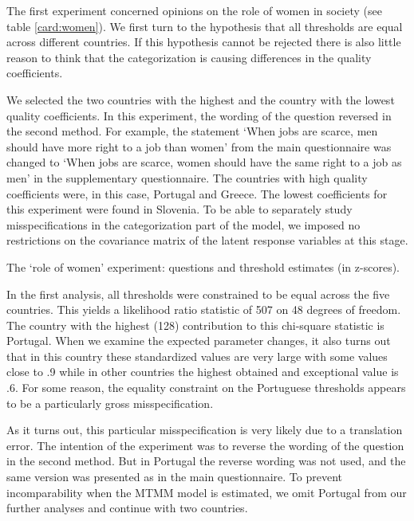 \documentclass[a4paper,12pt]{article}
\begin{document}
The first experiment concerned opinions on the role of women in society (see table \ref{card:women}). We first turn to the hypothesis that all thresholds are equal across different countries. If this hypothesis cannot be rejected  there is also little reason to think that the categorization is causing differences in the quality coefficients. 

We selected the two countries with the highest and the country with the lowest quality coefficients. In this experiment, the wording of the question reversed in the second method. For example, the statement `When jobs are scarce, men should have more right to a job than women' from the main questionnaire was changed to `When jobs are scarce, women should have the same right to a job as men' in the supplementary questionnaire. The countries with high quality coefficients were, in this case, Portugal and Greece. The lowest coefficients for this experiment were found in Slovenia. To be able to separately study misspecifications in the categorization part of the model, we imposed no restrictions on the covariance matrix of the latent response variables at this stage. 

\begin{table}[bht]\caption{\label{card:women}The `role of women' experiment: questions and threshold estimates (in z-scores).}\fbox{\begin{minipage}{\textwidth}\begin{small}
	
\end{small}\end{minipage}}\end{table}

In the first analysis, all thresholds were constrained to be equal across the five countries. This yields a likelihood ratio statistic of 507 on 48 degrees of freedom. The country with the highest (128) contribution to this chi-square statistic is Portugal. When we examine the expected parameter changes, it also turns out that in this country these standardized values are very large with some values close to .9 while in other countries the highest obtained and exceptional value is .6. For some reason, the equality constraint on the Portuguese thresholds appears to be a particularly gross misspecification.

As it turns out, this particular misspecification is very likely due to a translation error. The intention of the experiment was to reverse the wording of the question in the second method. But in Portugal the reverse wording was not used, and the same version was presented as in the main questionnaire.  To prevent incomparability when the MTMM model is estimated, we omit Portugal from our further analyses and continue with two countries. 
\end{document}
